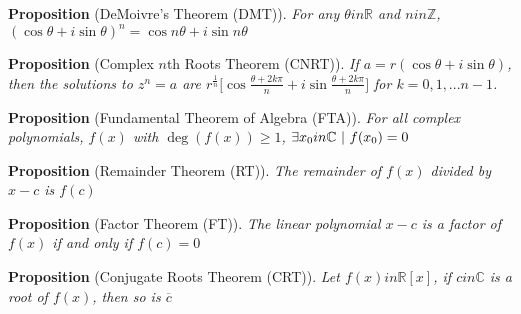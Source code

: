 \documentclass[12pt]{article}
\newcommand{\propositionlist}[2]{{\bf Proposition} (#1). \emph{#2}}
\begin{document}
\propositionlist{DeMoivre's Theorem (DMT)}{For any $\theta in \mathbb{R}$ and $n in \mathbb{Z}$, $(\cos\theta + i\sin\theta)^n = \cos n\theta + i\sin n\theta$}

\propositionlist{Complex $n$th Roots Theorem (CNRT)}{If $a = r(\cos\theta + i\sin\theta)$, then the solutions to $z^n = a$ are $r^\frac{1}{n} \bigg[ \cos\frac{\theta + 2k\pi}{n} + i\sin\frac{\theta + 2k\pi}{n} \bigg]$ for $k = 0, 1, ... n-1$.}

\propositionlist{Fundamental Theorem of Algebra (FTA)}{For all complex polynomials, $f(x)$ with $\deg(f(x)) \geq 1$, $\exists x_0 in \mathbb{C} \ |\  f(x_0) = 0$}

\propositionlist{Remainder Theorem (RT)}{The remainder of $f(x)$ divided by $x-c$ is $f(c)$}

\propositionlist{Factor Theorem (FT)}{The linear polynomial $x-c$ is a factor of $f(x)$ if and only if $f(c) = 0$}

\propositionlist{Conjugate Roots Theorem (CRT)}{Let $f(x) in \mathbb{R}[x]$, if $c in \mathbb{C}$ is a root of $f(x)$, then so is $\overline{c}$}
\end{document}
